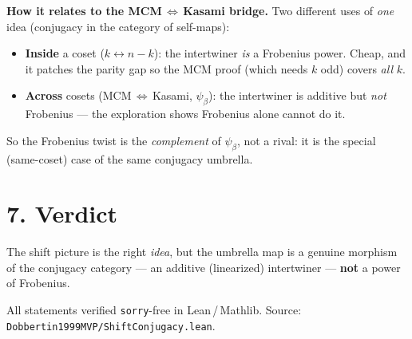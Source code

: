 \documentclass[11pt]{article}
\begin{document}
\begin{note}
\textbf{How it relates to the MCM\,$\Leftrightarrow$\,Kasami bridge.} Two
different uses of \emph{one} idea (conjugacy in the category of
self-maps):
\begin{itemize}\itemsep0pt
  \item \textbf{Inside} a coset ($k\leftrightarrow n-k$): the intertwiner
    \emph{is} a Frobenius power. Cheap, and it patches the parity gap so the
    MCM proof (which needs $k$ odd) covers \emph{all} $k$.
  \item \textbf{Across} cosets (MCM\,$\Leftrightarrow$\,Kasami, $\psi_\beta$):
    the intertwiner is additive but \emph{not} Frobenius --- the exploration
    shows Frobenius alone cannot do it.
\end{itemize}
So the Frobenius twist is the \emph{complement} of $\psi_\beta$, not a
rival: it is the special (same-coset) case of the same conjugacy umbrella.
\end{note}

\section*{7. Verdict}

\begin{center}
\end{center}

\begin{note}
The shift picture is the right \emph{idea}, but the umbrella map is a
genuine morphism of the conjugacy category --- an additive (linearized)
intertwiner --- \textbf{not} a power of Frobenius.
\end{note}

\vfill
\begin{center}\scriptsize
All statements verified \texttt{sorry}-free in Lean\,/\,Mathlib.
Source: \texttt{Dobbertin1999MVP/ShiftConjugacy.lean}.
\end{center}
\end{document}

